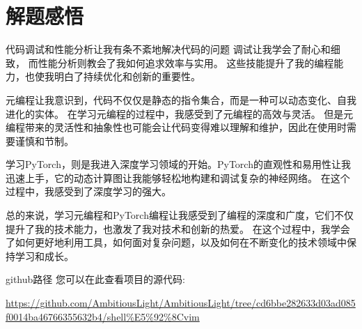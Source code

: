 \documentclass{article}
\begin{document}
\section{解题感悟}
代码调试和性能分析让我有条不紊地解决代码的问题
调试让我学会了耐心和细致，
而性能分析则教会了我如何追求效率与实用。
这些技能提升了我的编程能力，也使我明白了持续优化和创新的重要性。

元编程让我意识到，代码不仅仅是静态的指令集合，而是一种可以动态变化、自我进化的实体。
在学习元编程的过程中，我感受到了元编程的高效与灵活。
但是元编程带来的灵活性和抽象性也可能会让代码变得难以理解和维护，因此在使用时需要谨慎和节制。

学习PyTorch，则是我进入深度学习领域的开始。PyTorch的直观性和易用性让我迅速上手，它的动态计算图让我能够轻松地构建和调试复杂的神经网络。
在这个过程中，我感受到了深度学习的强大。

总的来说，学习元编程和PyTorch编程让我感受到了编程的深度和广度，它们不仅提升了我的技术能力，也激发了我对技术和创新的热爱。
在这个过程中，我学会了如何更好地利用工具，如何面对复杂问题，以及如何在不断变化的技术领域中保持学习和成长。

github路径
您可以在此查看项目的源代码: 

\url{https://github.com/AmbitiousLight/AmbitiousLight/tree/cd6bbe282633d03ad085f0014ba46766355632b4/shell%E5%92%8Cvim}
\end{document}
